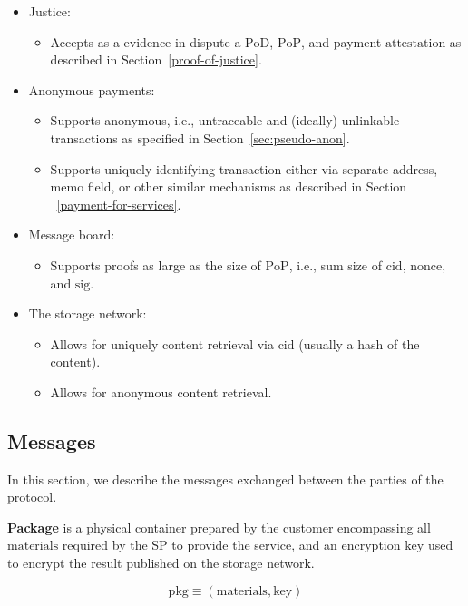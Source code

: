 \documentclass{ieeeaccess}
\begin{document}
\begin{itemize}
\item Justice:
    \begin{itemize}
        \item Accepts as a evidence in dispute a $\mathrm{PoD}$, $\mathrm{PoP}$, and payment $\mathrm{attestation}$ as described in Section~\ref{proof-of-justice}.
    \end{itemize}

\item Anonymous payments:
    \begin{itemize}
        \item Supports anonymous, i.e., untraceable and (ideally) unlinkable transactions as specified in Section~\ref{sec:pseudo-anon}.
        \item Supports uniquely identifying transaction either via separate address, memo field, or other similar mechanisms as described in Section ~\ref{payment-for-services}. 
    \end{itemize}

\item Message board:
    \begin{itemize}
        \item Supports proofs as large as the size of $\mathrm{PoP}$, i.e., sum size of $\mathrm{cid}$, $\mathrm{nonce}$, and $\mathrm{sig}$.
    \end{itemize}

\item The storage network:
    \begin{itemize}
        \item Allows for uniquely content retrieval via $\mathrm{cid}$ (usually a hash of the content).
        \item Allows for anonymous content retrieval.
    \end{itemize}
\end{itemize}

\subsection{Messages}\label{messages}
In this section, we describe the messages exchanged between the parties of the protocol.

\noindent \textbf
{Package}\label{package} is a physical container prepared by the customer encompassing all $\mathrm{materials}$ required by the SP to provide the service, and an encryption $\mathrm{key}$ used to encrypt the result published on the storage network.

$$\mathrm{pkg} \equiv (\mathrm{materials}, \mathrm{key})$$
\end{document}
